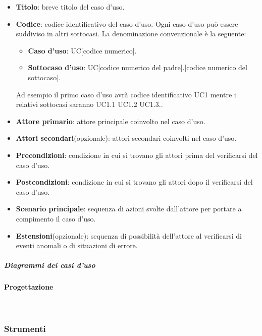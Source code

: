 \documentclass[../norme-di-progetto.tex]{subfiles}
\begin{document}
\begin{itemize}
\item \textbf{Titolo}: breve titolo del caso d'uso.
\item \textbf{Codice}: codice identificativo del caso d'uso. Ogni caso d'uso può essere suddiviso in altri sottocasi. La denominazione convenzionale è la seguente:
\begin{itemize}
	\item \textbf{Caso d'uso}: UC[codice numerico].
    \item \textbf{Sottocaso d'uso}: UC[codice numerico del padre].[codice numerico del sottocaso].
\end{itemize}
Ad esempio il primo caso d'uso avrà codice identificativo UC1 mentre i relativi sottocasi saranno UC1.1 UC1.2 UC1.3..
\item \textbf{Attore primario}: attore principale coinvolto nel caso d'uso.
\item \textbf{Attori secondari}(opzionale): attori secondari coinvolti nel caso d'uso.
\item \textbf{Precondizioni}: condizione in cui si trovano gli attori prima del verificarsi del caso d'uso.
\item \textbf{Postcondizioni}: condizione in cui si trovano gli attori dopo il verificarsi del caso d'uso.
\item \textbf{Scenario principale}: sequenza di azioni svolte dall'attore per portare a compimento il caso d'uso.
\item \textbf{Estensioni}(opzionale): sequenza di possibilità dell'attore al verificarsi di eventi anomali o di situazioni di errore.
\end{itemize}
\subparagraph{Diagrammi dei casi d'uso}
\label{subp:diagrammi dei casi d'uso} 
\paragraph{Progettazione}\mbox{}\\
\label{par:progettazione}
\subsubsection{Strumenti}
\label{subs:strumenti}
\end{document}
